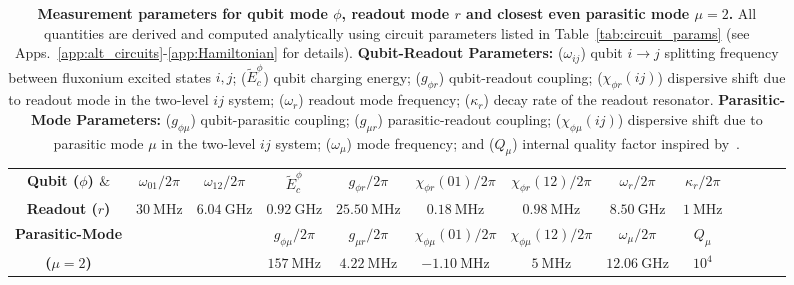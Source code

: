 \documentclass[%
reprint,
superscriptaddress,
 amsmath,amssymb,
 aps,
 prx,
longbibliography,
floatfix,
]{revtex4-2}
\begin{document}




\renewcommand{\arraystretch}{1.5} %

\begin{table}[tb]
    \centering
\begin{tabular}{|c|c|c|c|c|c|c|c|c|c|c|c|c|}
    \hline
    \textbf{Qubit ($\phi$) $\&$}&$\omega_{01}/2\pi$&$\omega_{12}/2\pi$ &$\tilde{E}^\phi_c$ &$g_{\phi r}/2\pi$&$\chi_{\phi r}(01)/2\pi$&$\chi_{\phi r}(12)/2\pi$&$\omega_r/2\pi$&$\kappa_r/2\pi$\\
    \cline{2-9}
\textbf{Readout ($r$)}&$30 \ \mathrm{MHz}$& $6.04 \ \mathrm{GHz}$ & $0.92 \ \mathrm{GHz}$& $25.50 \ \mathrm{MHz}$& $0.18 \ \mathrm{MHz}$&$0.98 \ \mathrm{MHz}$&$8.50 \ \mathrm{GHz}$&$1 \ \mathrm{MHz}$\\    
\hline\textbf{Parasitic-Mode} & \multicolumn{2}{c|}{} & $g_{\phi\mu}/2\pi$&$g_{\mu r}/2\pi$&$\chi_{\phi\mu}(01)/2\pi$&$\chi_{\phi\mu}(12)/2\pi$&$\omega_\mu/2\pi$&$Q_\mu$\\
    \cline{4-9}
\textbf{($\mu=2$)}&\multicolumn{2}{c|}{} &$157 \ \mathrm{MHz}$& $4.22 \ \mathrm{MHz}$& $-1.10 \ \mathrm{MHz}$& $5 \ \mathrm{MHz}$& $12.06 \ \mathrm{GHz}$&$10^{4}$\\    
\hline
\end{tabular}
\caption{{\bf Measurement parameters for qubit mode $\phi$, readout mode $r$ and closest even parasitic mode $\mu=2$.}  All quantities are derived and computed analytically using circuit parameters listed in Table~\ref{tab:circuit_params} (see Apps.~\ref{app:alt_circuits}-\ref{app:Hamiltonian} for details). \textbf{Qubit-Readout Parameters:} ($\omega_{ij}$) qubit $i\rightarrow j$ splitting frequency between fluxonium excited states $i, j$; ($\tilde{E}^\phi_c$) qubit charging energy; ($g_{\phi r}$) qubit-readout coupling; ($\chi_{\phi r}(ij)$) dispersive shift due to readout mode in the two-level $ij$ system; ($\omega_r$) readout mode frequency; ($\kappa_r$) decay rate of the readout resonator. \textbf{Parasitic-Mode Parameters:} ($g_{\phi \mu}$) qubit-parasitic coupling; ($g_{\mu r}$) parasitic-readout coupling; ($\chi_{\phi \mu}(ij)$) dispersive shift due to parasitic mode $\mu$ in the two-level $ij$ system; ($\omega_\mu$) mode frequency; and ($Q_\mu$) internal quality factor inspired by~\cite{masluk_microwave_2012}.}   \label{tab:readout_params}
\end{table}
\end{document}
